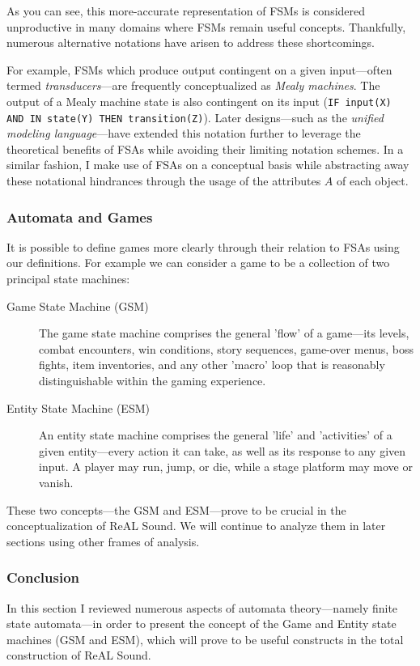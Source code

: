 \documentclass{report}
\newcommand{\rs}{ReAL Sound\xspace}
\begin{document}
As you can see, this more-accurate representation of FSMs is considered unproductive in many domains where FSMs remain useful concepts\cite{state}. Thankfully, numerous alternative notations have arisen to address these shortcomings. 

For example, FSMs which produce output contingent on a given input---often termed \emph{transducers}\cite{FSM}---are frequently conceptualized as \emph{Mealy machines}. The output of a Mealy machine state is also contingent on its input (\texttt{IF input(X) AND IN state(Y) THEN transition(Z)}). Later designs---such as the \emph{unified modeling language}---have extended this notation further to leverage the theoretical benefits of FSAs while avoiding their limiting notation schemes\cite{omg2011umls}. In a similar fashion, I make use of FSAs on a conceptual basis while abstracting away these notational hindrances through the usage of the attributes $A$ of each object. 

\subsubsection{Automata and Games}
It is possible to define games more clearly through their relation to FSAs using our definitions. For example we can consider a game to be a collection of two principal state machines: 
\begin{description}
    \item[Game State Machine (GSM)] The game state machine comprises the general 'flow' of a game---its levels, combat encounters, win conditions, story sequences, game-over menus, boss fights, item inventories, and any other 'macro' loop that is reasonably distinguishable within the gaming experience.
    \item[Entity State Machine (ESM)] An entity state machine comprises the general 'life' and 'activities' of a given entity---every action it can take, as well as its response to any given input. A player may run, jump, or die, while a stage platform may move or vanish.     
\end{description}

These two concepts---the GSM and ESM---prove to be crucial in the conceptualization of \rs. We will continue to analyze them in later sections using other frames of analysis.

\subsubsection{Conclusion}
In this section I reviewed numerous aspects of automata theory---namely finite state automata---in order to present the concept of the Game and Entity state machines (GSM and ESM), which will prove to be useful constructs in the total construction of \rs.
\end{document}
